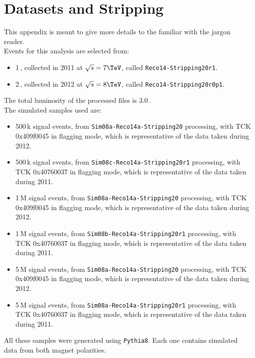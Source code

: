 
\chapter{Datasets and Stripping}
\label{AppendixC}
This appendix is meant to give more details to the familiar with the \lhcb jargon reader.\\
 
\noindent Events for this analysis are selected from:
\begin{itemize}
\item 1\,\invfb, collected in 2011 at $\sqrt{s}=7\TeV$, called \texttt{Reco14-Stripping20r1}.
\item 2\,\invfb, collected in 2012 at $\sqrt{s}=8\TeV$, called \texttt{Reco14-Stripping20r0p1}.
\end{itemize}
The total luminosity of the processed files is 3.0\,\invfb.\\

\noindent The simulated samples used are:

\begin{itemize}

\item %
500\,k \BsJpsiKst signal events, from \texttt{Sim08a-Reco14a-Stripping20} processing, with TCK 0x409f0045 in flagging mode, which is representative of the data taken during 2012.  

\item %
500\,k \BsJpsiKst signal events, from \texttt{Sim08c-Reco14a-Stripping20r1} processing, with TCK 0x40760037 in flagging mode, which is representative of the data taken during 2011.  

\item %
1\,M \BdJpsiKst signal events, from \texttt{Sim08a-Reco14a-Stripping20} processing, with TCK 0x409f0045 in flagging mode, which is representative of the data taken during 2012.  

\item %
1\,M \BdJpsiKst signal events, from \texttt{Sim08b-Reco14a-Stripping20r1} processing, with TCK 0x40760037 in flagging mode, which is representative of the data taken during 2011.    

\item %
5\,M \BsJpsiPhi signal events, from \texttt{Sim08a-Reco14a-Stripping20} processing, with TCK 0x409f0045 in flagging mode, which is representative of the data taken during 2012.  

\item %
5\,M \BsJpsiPhi signal events, from \texttt{Sim08a-Reco14a-Stripping20r1} processing, with TCK 0x40760037 in flagging mode, which is representative of the data taken during 2011.

\end{itemize}
All these samples were generated using \texttt{Pythia8}. Each one contains simulated data from both magnet polarities.\\


